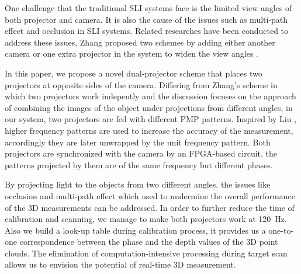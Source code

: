 \documentclass[10pt,letterpaper]{article}
\begin{document}
One challenge that the traditional SLI systems face is the limited view angles of both projector and camera. It is also the cause of the issues such as multi-path effect \cite{otoo16} and occlusion \cite{linj13} in SLI systems. Related researches have been conducted to address these issues, Zhang {\etal} proposed two schemes by adding either another camera or one extra projector in the system to widen the view angles \cite{zhan08, jian18}.

In this paper, we propose a novel dual-projector scheme that places two projectors at opposite sides of the camera. Differing from Zhang's scheme in which two projectors work indepently and the discussion focuses on the approach of combining the images of the object under projections from different angles, in our system, two projectors are fed with different PMP patterns. Inspired by Liu {\etal}, higher frequency patterns are used to increase the accuracy of the measurement, accordingly they are later unwrapped by the unit frequency pattern. Both projectors are synchronized with the camera by an FPGA-based circuit, the patterns projected by them are of the same frequency but different phases. 

By projecting light to the objects from two different angles, the issues like occlusion and multi-path effect which used to undermine the overall performance of the 3D measurements can be addressed. In order to further reduce the time of calibration and scanning, we manage to make both projectors work at 120~Hz. Also we build a look-up table during calibration process, it provides us a one-to-one correspondence between the phase and the depth values of the 3D point clouds. The elimination of computation-intensive processing during target scan allows us to envision the potential of real-time 3D measurement.



\end{document}
